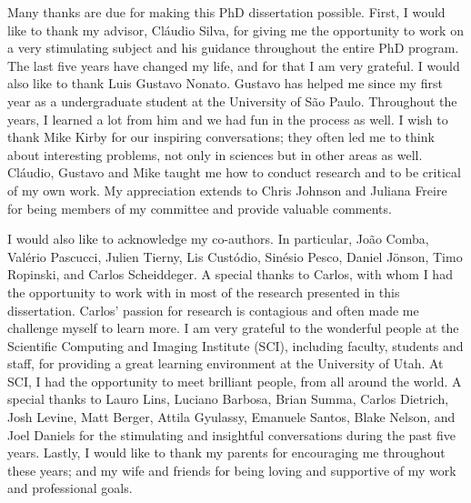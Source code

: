 
Many thanks are due for making this PhD dissertation possible. 
%
First, I would like to thank my advisor, Cl\'audio Silva, for giving me the opportunity to work on a very stimulating subject and his guidance throughout the entire PhD program. The last five years have changed my life, and for that I am very grateful.
%
I would also like to thank Luis Gustavo Nonato. Gustavo has helped me since my first year as a undergraduate student at the University of S\~ao Paulo. Throughout the years, I learned a lot from him and we had fun in the process as well.
%
I wish to thank Mike Kirby for our inspiring conversations; they often led me to think about interesting problems, not only in sciences but in other areas as well. 
%
Cl\'audio, Gustavo and Mike taught me how to conduct research and to be critical of my own work.  
%
My appreciation extends to Chris Johnson and Juliana Freire for being members of my committee and provide valuable comments. 

I would also like to acknowledge my co-authors. In particular, Jo\~ao Comba, Val\'erio Pascucci, Julien Tierny,  Lis Cust\'odio, Sin\'esio Pesco, Daniel J\"onson, Timo Ropinski, and  Carlos Scheiddeger. A special thanks to Carlos, with whom I had the opportunity to work with in most of the research presented in this dissertation. Carlos' passion for research is contagious and often made me challenge myself to learn more.
%
I am very grateful to the wonderful people at the Scientific Computing and Imaging Institute (SCI), including faculty, students and staff,  for providing a great learning environment at the University of Utah. 
%
At SCI, I had the opportunity to meet brilliant people, from all around the world.
%
A special thanks to Lauro Lins, Luciano Barbosa, Brian Summa, Carlos Dietrich, Josh Levine, Matt Berger, Attila Gyulassy, Emanuele Santos, Blake Nelson, and Joel Daniels for the stimulating and insightful conversations during the past five years.
%
Lastly, I would like to thank my parents for encouraging me throughout these years; and my wife and friends for being loving and supportive of my work and professional goals.